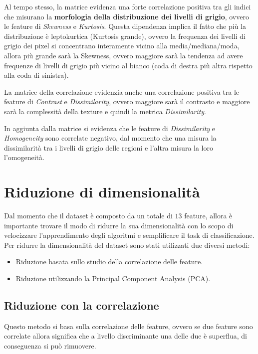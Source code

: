 Al tempo stesso, la matrice evidenza una forte correlazione positiva tra gli 
indici che misurano la \textbf{morfologia della distribuzione dei livelli
      di grigio}, ovvero le feature di \textit{Skewness} e \textit{Kurtosis}.
Questa dipendenza implica il fatto che più la distribuzione è leptokurtica
(Kurtosis grande), ovvero la frequenza dei livelli di grigio dei pixel si
concentrano interamente vicino alla media/mediana/moda, allora più grande sarà
la Skewness, ovvero maggiore sarà la tendenza ad avere frequenze di livelli di
grigio più vicino al bianco (coda di destra più altra rispetto alla coda di
sinistra).

La matrice della correlazione evidenzia anche una correlazione positiva tra le
feature di \textit{Contrast} e \textit{Dissimilarity}, ovvero maggiore sarà il
contrasto e maggiore sarà la complessità della texture e quindi la metrica
\textit{Dissimilarity}.

In aggiunta dalla matrice si evidenza che le feature di \textit{Dissimilarity}
e \textit{Homogeneity} sono correlate negativo, dal momento che una misura la
dissimilarità tra i livelli di grigio delle regioni e l'altra misura la loro
l'omogeneità.

\section{Riduzione di dimensionalità} \label{sec:riduzone_di_dimensionalità}
Dal momento che il dataset è composto da un totale di $13$ feature, allora
è importante trovare il modo di ridurre la sua dimensionalità con lo scopo di
velocizzare l'apprendimento degli algoritmi e semplificare il task di classificazione.
Per ridurre la dimensionalità del dataset sono stati utilizzati due diversi metodi:
\begin{itemize}
      \item Riduzione basata sullo studio della correlazione delle feature.
      \item Riduzione utilizzando la Principal Component Analysis (PCA).
\end{itemize}
\subsection{Riduzione con la correlazione} \label{sec:riduzione_correlazione}
Questo metodo si basa sulla correlazione delle feature, ovvero se due feature
sono correlate allora significa che a livello discriminante una delle due è
superflua, di conseguenza si può rimuovere.

